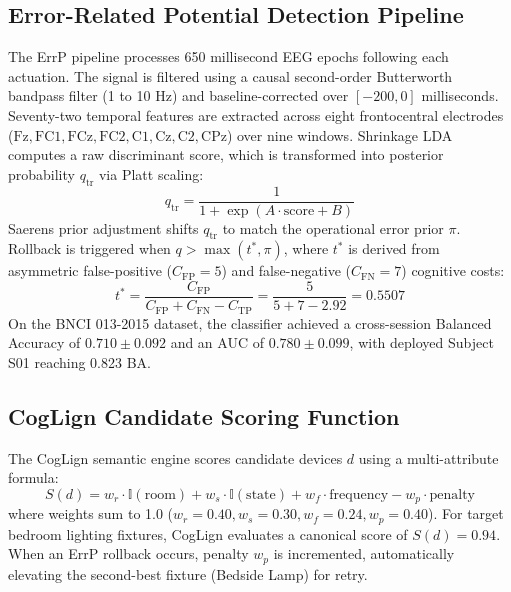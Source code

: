 \documentclass[12pt,a4paper]{report}
\begin{document}
\subsection{Error-Related Potential Detection Pipeline}
The ErrP pipeline processes 650 millisecond EEG epochs following each actuation. The signal is filtered using a causal second-order Butterworth bandpass filter (1 to 10 Hz) and baseline-corrected over $[-200, 0]$ milliseconds. Seventy-two temporal features are extracted across eight frontocentral electrodes ($\mathrm{Fz}, \mathrm{FC1}, \mathrm{FCz}, \mathrm{FC2}, \mathrm{C1}, \mathrm{Cz}, \mathrm{C2}, \mathrm{CPz}$) over nine windows. Shrinkage LDA computes a raw discriminant score, which is transformed into posterior probability $q_{\mathrm{tr}}$ via Platt scaling:
\begin{equation}
    q_{\mathrm{tr}} = \frac{1}{1 + \exp(A \cdot \text{score} + B)}
\end{equation}
Saerens prior adjustment shifts $q_{\mathrm{tr}}$ to match the operational error prior $\pi$. Rollback is triggered when $q > \max(t^*, \pi)$, where $t^*$ is derived from asymmetric false-positive ($C_{\mathrm{FP}} = 5$) and false-negative ($C_{\mathrm{FN}} = 7$) cognitive costs:
\begin{equation}
    t^* = \frac{C_{\mathrm{FP}}}{C_{\mathrm{FP}} + C_{\mathrm{FN}} - C_{\mathrm{TP}}} = \frac{5}{5 + 7 - 2.92} = 0.5507
\end{equation}
On the BNCI 013-2015 dataset, the classifier achieved a cross-session Balanced Accuracy of $0.710 \pm 0.092$ and an AUC of $0.780 \pm 0.099$, with deployed Subject S01 reaching 0.823 BA.

\subsection{CogLign Candidate Scoring Function}
The CogLign semantic engine scores candidate devices $d$ using a multi-attribute formula:
\begin{equation}
    S(d) = w_r \cdot \mathbb{I}(\text{room}) + w_s \cdot \mathbb{I}(\text{state}) + w_f \cdot \text{frequency} - w_p \cdot \text{penalty}
\end{equation}
where weights sum to 1.0 ($w_r = 0.40, w_s = 0.30, w_f = 0.24, w_p = 0.40$). For target bedroom lighting fixtures, CogLign evaluates a canonical score of $S(d) = 0.94$. When an ErrP rollback occurs, penalty $w_p$ is incremented, automatically elevating the second-best fixture (Bedside Lamp) for retry.
\end{document}
